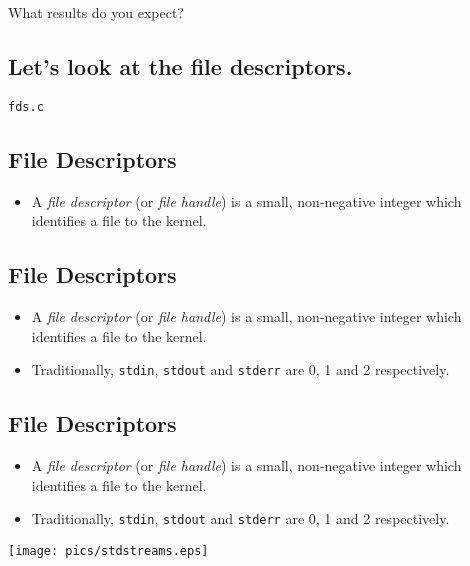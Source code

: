 \documentclass[xga]{xdvislides}
\begin{document}
What results do you expect?

\subsection{Let's look at the file descriptors.}
\vspace*{\fill}
\begin{center}
\Huge
\verb+fds.c+
\normalsize
\end{center}
\vspace*{\fill}



%
\subsection{File Descriptors}
\begin{itemize}
	\item A {\em file descriptor} (or {\em file handle}) is a small,
		non-negative integer which identifies a file to the kernel.
\end{itemize}


\subsection{File Descriptors}
\begin{itemize}
	\item A {\em file descriptor} (or {\em file handle}) is a small,
		non-negative integer which identifies a file to the kernel.
	\item Traditionally, {\tt stdin}, {\tt stdout} and {\tt stderr}
		are 0, 1 and 2 respectively.
\end{itemize}

\subsection{File Descriptors}
\begin{itemize}
	\item A {\em file descriptor} (or {\em file handle}) is a small,
		non-negative integer which identifies a file to the kernel.
	\item Traditionally, {\tt stdin}, {\tt stdout} and {\tt stderr}
		are 0, 1 and 2 respectively.
\end{itemize}
\texttt{[image: pics/stdstreams.eps]}
\end{document}
